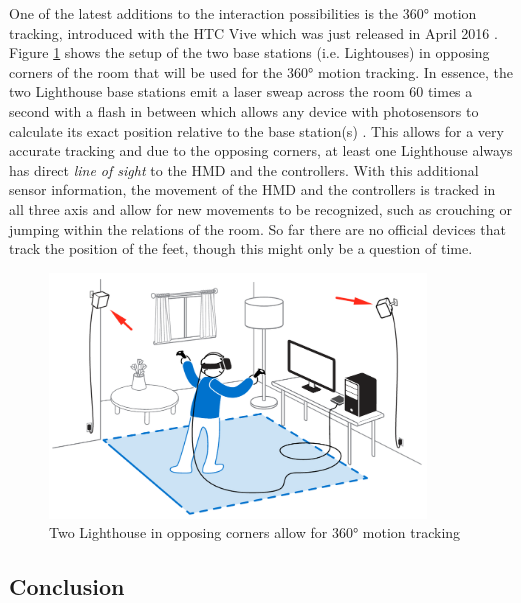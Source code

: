 One of the latest additions to the interaction possibilities is the 360° motion tracking, introduced with the HTC Vive which was just released in April 2016 \citep{Htcvive2016}. Figure \ref{fig:lighthouses} shows the setup of the two base stations (i.e. Lightouses) in opposing corners of the room that will be used for the 360° motion tracking. In essence, the two Lighthouse base stations emit a laser sweap across the room 60 times a second with a flash in between which allows any device with photosensors to calculate its exact position relative to the base station(s) \citep{Gizmodo2015}. This allows for a very accurate tracking and due to the opposing corners, at least one Lighthouse always has direct \textit{line of sight} to the HMD and the controllers. \newline
With this additional sensor information, the movement of the HMD and the controllers is tracked in all three axis and allow for new movements to be recognized, such as crouching or jumping within the relations of the room. \newline
So far there are no official devices that track the position of the feet, though this might only be a question of time.
\begin{figure}[h]
	\begin{center}
		\includegraphics[width=10cm]{03_Figures/05_LitReview/HTCCorp2016_LighthouseRoomScale.png}
		\caption[Two Lighthouse in opposing corners allow for 360° motion tracking]{Two Lighthouse in opposing corners allow for 360° motion tracking \citep{HTCCorp2016}}
		\label{fig:lighthouses}
	\end{center}
\end{figure}



\subsection{Conclusion}

